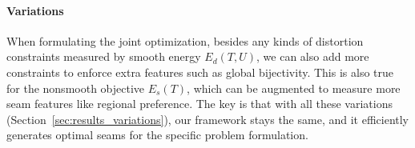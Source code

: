  
\paragraph{Variations}

When formulating the joint optimization, besides any kinds of distortion constraints measured by smooth energy $E_d(T,U)$, we can also add more constraints to enforce extra features such as global bijectivity.
This is also true for the nonsmooth objective $E_s(T)$, which can be augmented to measure more seam features like regional preference. 
The key is that with all these variations (Section~\ref{sec:results_variations}), our framework stays the same, and it efficiently generates optimal seams for the specific problem formulation.
